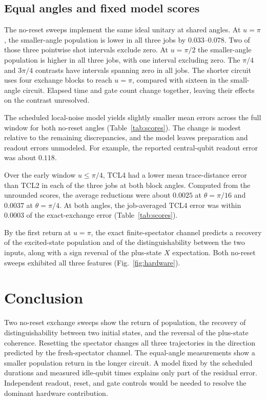 \documentclass[
    pra,
    showpacs,
    groupedaddress,
    notitlepage,
    floatfix,
    nofootinbib
]{revtex4-2}
\begin{document}
\subsection{Equal angles and fixed model scores}
The no-reset sweeps implement the same ideal unitary at shared angles. At $u=\pi$, the smaller-angle population is lower in all three 
jobs by $0.033$--$0.078$. Two of those three pointwise shot intervals exclude zero. At $u=\pi/2$ the smaller-angle population is higher 
in all three jobs, with one interval excluding zero. The $\pi/4$ and $3\pi/4$ contrasts have intervals spanning zero in all jobs. 
The shorter circuit uses four exchange blocks to reach $u=\pi$, compared with sixteen in the small-angle circuit. Elapsed time and gate count 
change together, leaving their effects on the contrast unresolved.

\begin{table}[htb]
 \centering
 
 \caption{Fixed predictions scored against the three measured initial states. Scores are means of the three job-level values. 
 The full window covers $0\le u\le\pi$ and the early window uses $0\le u\le\pi/4$ at the measured block counts.}
 \label{tab:scores}
\end{table}

The scheduled local-noise model yields slightly smaller mean errors across the full window for both no-reset angles (Table~\ref{tab:scores}). 
The change is modest relative to the remaining discrepancies, and the model leaves preparation and readout errors unmodeled. For example, 
the reported central-qubit readout error was about $0.118$.

Over the early window $u\le\pi/4$, TCL4 had a lower mean trace-distance error than TCL2 in each of the three jobs at both block angles.
Computed from the unrounded scores, the average reductions were about $0.0025$ at $\theta=\pi/16$ and $0.0037$ at $\theta=\pi/4$.
At both angles, the job-averaged TCL4 error was within $0.0003$ of the exact-exchange error (Table~\ref{tab:scores}).

By the first return at $u=\pi$, the exact finite-spectator channel predicts a recovery of the excited-state population and of the distinguishability
between the two inputs, along with a sign reversal of the plus-state $X$ expectation. Both no-reset sweeps exhibited all three features
(Fig.~\ref{fig:hardware}).

\section{Conclusion}
Two no-reset exchange sweeps show the return of population, the recovery of distinguishability between two initial states, and the reversal of the 
plus-state coherence. Resetting the spectator changes all three trajectories in the direction predicted by the fresh-spectator channel. 
The equal-angle measurements show a smaller population return in the longer circuit. A model fixed by the scheduled durations and measured 
idle-qubit times explains only part of the residual error. Independent readout, reset, and gate controls would be needed to resolve the 
dominant hardware contribution.
\end{document}
